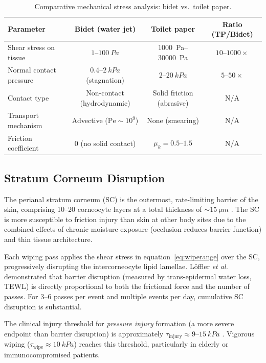 \documentclass[aps,prfluids,reprint,amsmath,amssymb,floatfix]{revtex4-2}
\newcommand{\Pe}{\mathrm{Pe}}
\begin{document}
\begin{table}[h!]
\centering
\caption{Comparative mechanical stress analysis: bidet vs.\ toilet paper.}
\label{tab:stresscomparison}
\begin{tabular}{lccc}
\toprule
\textbf{Parameter} & \textbf{Bidet (water jet)} & \textbf{Toilet paper} & \textbf{Ratio (TP/Bidet)}\\
\midrule
Shear stress on tissue     & $1$--$\SI{100}{Pa}$    & \SI{1000}{Pa}--\SI{30000}{Pa} & $10$--$1000\times$\\
Normal contact pressure    & $0.4$--$\SI{2}{kPa}$ (stagnation) & $2$--$\SI{20}{kPa}$ & $5$--$50\times$\\
Contact type               & Non-contact (hydrodynamic) & Solid friction (abrasive) & N/A\\
Transport mechanism        & Advective ($\Pe \sim 10^9$)   & None (smearing)         & N/A\\
Friction coefficient       & $0$ (no solid contact) & $\mu_k = 0.5$--$1.5$   & N/A\\
\bottomrule
\end{tabular}
\end{table}

\subsection{Stratum Corneum Disruption}
\label{subsec:SC}

The perianal stratum corneum (SC) is the outermost, rate-limiting barrier
of the skin, comprising 10--20 corneocyte layers at a total thickness of
$\sim\SI{15}{\micro m}$ \citep{Loden2012}. The SC is more susceptible to
friction injury than skin at other body sites due to the combined effects
of chronic moisture exposure (occlusion reduces barrier function) and thin
tissue architecture.

Each wiping pass applies the shear stress in equation~\eqref{eq:wiperange}
over the SC, progressively disrupting the intercorneocyte lipid lamellae.
L\"offler \textit{et al.}\ \citep{Loffler2004} demonstrated that barrier
disruption (measured by trans-epidermal water loss, TEWL) is directly
proportional to both the frictional force and the number of passes.
For 3--6 passes per event and multiple events per day, cumulative SC
disruption is substantial.

The clinical injury threshold for \emph{pressure injury} formation (a more
severe endpoint than barrier disruption) is approximately
$\tau_\mathrm{injury} \approx 9$--$\SI{15}{kPa}$ \citep{Broderick2021}.
Vigorous wiping ($\tau_\mathrm{wipe} \approx \SI{10}{kPa}$) reaches this
threshold, particularly in elderly or immunocompromised patients.
\end{document}
